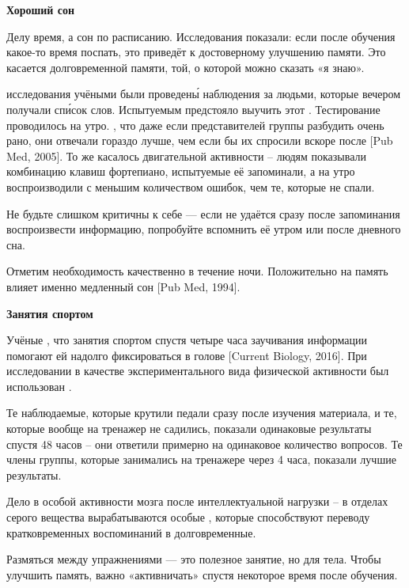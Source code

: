 \textbf{Хороший сон}

Делу время, а сон по расписанию. Исследования показали: если после обучения какое-то время поспать, это приведёт к достоверному улучшению памяти. Это касается долговременной памяти, той, о которой можно сказать «я знаю».

 исследования учёными были проведен\'{ы} наблюдения за людьми, которые вечером получали сп\'{и}сок слов. Испытуемым предстояло выучить этот . Тестирование проводилось на утро. , что даже если представителей группы разбудить очень рано, они отвечали гораздо лучше, чем если бы их спросили вскоре после  [Pub Med, 2005]. То же касалось двигательной активности – людям показывали комбинацию клавиш фортепиано, испытуемые её запоминали, а на утро воспроизводили с меньшим количеством ошибок, чем те, которые не спали.

Не будьте слишком критичны к себе --- если не удаётся сразу после запоминания воспроизвести информацию, попробуйте вспомнить её утром или после дневного сна.

Отметим необходимость качественно  в течение ночи. Положительно на память влияет именно медленный сон [Pub Med, 1994].

\textbf{Занятия спортом}

Учёные , что занятия спортом спустя четыре часа заучивания информации помогают ей надолго фиксироваться в голове [Current Biology, 2016]. При исследовании в качестве экспериментального вида физической активности был использован .

Те наблюдаемые, которые крутили педали сразу после изучения материала, и те, которые вообще на тренажер не садились, показали одинаковые результаты спустя 48 часов – они ответили примерно на одинаковое количество вопросов. Те члены группы, которые занимались на тренажере через 4 часа, показали лучшие результаты.

Дело в особой активности мозга после интеллектуальной нагрузки – в отделах серого вещества вырабатываются особые , которые способствуют переводу кратковременных воспоминаний в долговременные.

Размяться между упражнениями --- это полезное занятие, но для тела. Чтобы улучшить память, важно «активничать» спустя некоторое время после обучения.


